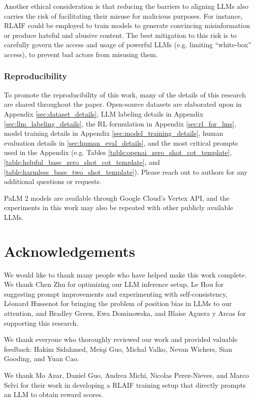 \documentclass[11pt]{article}
\begin{document}
Another ethical consideration is that reducing the barriers to aligning LLMs also carries the risk of facilitating their misuse for malicious purposes. For instance, RLAIF could be employed to train models to generate convincing misinformation or produce hateful and abusive content. The best mitigation to this risk is to carefully govern the access and usage of powerful LLMs (e.g. limiting ``white-box'' access), to prevent bad actors from misusing them.


\subsubsection*{Reproducibility}

To promote the reproducibility of this work, many of the details of this research are shared throughout the paper. Open-source datasets are elaborated upon in Appendix \ref{sec:dataset_details}, LLM labeling details in Appendix \ref{sec:llm_labeling_details}, the RL formulation in Appendix \ref{sec:rl_for_lms}, model training details in Appendix  \ref{sec:model_training_details}, human evaluation details in \ref{sec:human_eval_details}, and the most critical prompts used in the Appendix (e.g. Tables \ref{table:openai_zero_shot_cot_template}, \ref{table:helpful_base_zero_shot_cot_template}, and \ref{table:harmless_base_two_shot_template}). Please reach out to authors for any additional questions or requests.

PaLM 2 models are available through Google Cloud's Vertex API, and the experiments in this work may also be repeated with other publicly available LLMs.


\section*{Acknowledgements}
We would like to thank many people who have helped make this work complete. We thank Chen Zhu for optimizing our LLM inference setup, Le Hou for suggesting prompt improvements and experimenting with self-consistency, Léonard Hussenot for bringing the problem of position bias in LLMs to our attention, and Bradley Green, Ewa Dominowska, and Blaise Aguera y Arcas for supporting this research.

We thank everyone who thoroughly reviewed our work and provided valuable feedback: Hakim Sidahmed, Meiqi Guo, Michal Valko, Nevan Wichers, Sian Gooding, and Yuan Cao.

We thank Mo Azar, Daniel Guo, Andrea Michi, Nicolas Perez-Nieves, and Marco Selvi for their work in developing a RLAIF training setup that directly prompts an LLM to obtain reward scores.
\end{document}
